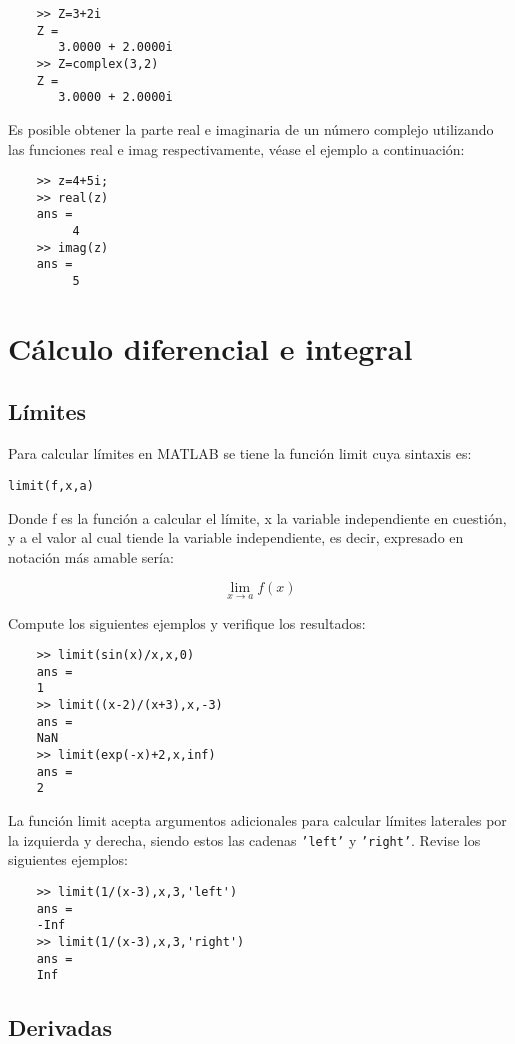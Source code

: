 \begin{verbatim}
	>> Z=3+2i
	Z =
	   3.0000 + 2.0000i
	>> Z=complex(3,2)
	Z =
	   3.0000 + 2.0000i
\end{verbatim}

Es posible obtener la parte real e imaginaria de un número complejo utilizando las 
funciones real e imag respectivamente, véase el ejemplo a continuación:

\begin{verbatim}
	>> z=4+5i;
	>> real(z)
	ans =
	     4
	>> imag(z)
	ans =
	     5
\end{verbatim}

\section{Cálculo diferencial e integral}

\subsection{Límites}

Para calcular límites en MATLAB se tiene la función limit  cuya sintaxis es:

\begin{verbatim}
limit(f,x,a)
\end{verbatim}

Donde f es la función a calcular el límite, x la variable independiente en cuestión, 
y a el valor al cual tiende la variable independiente, es decir, expresado en 
notación más amable sería:

$$ \lim_{x \to a} f(x) $$

Compute los siguientes ejemplos y verifique los resultados:

\begin{verbatim}
	>> limit(sin(x)/x,x,0)
	ans =
	1
	>> limit((x-2)/(x+3),x,-3)
	ans =
	NaN
	>> limit(exp(-x)+2,x,inf)
	ans =
	2
\end{verbatim}

La función limit acepta argumentos adicionales para calcular límites laterales por la 
izquierda y derecha, siendo estos las cadenas \texttt{'left'} y \texttt{'right'}. Revise los 
siguientes ejemplos:

\begin{verbatim}
	>> limit(1/(x-3),x,3,'left')
	ans =
	-Inf
	>> limit(1/(x-3),x,3,'right')
	ans =
	Inf
\end{verbatim}

\subsection{Derivadas}

